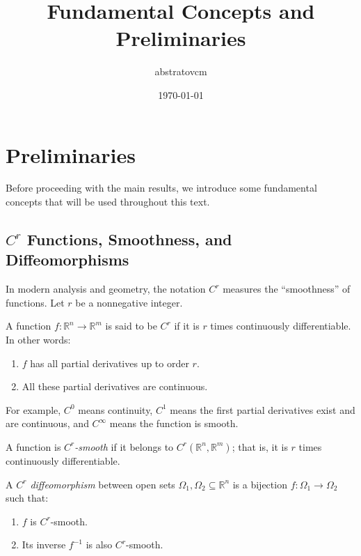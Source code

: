 \documentclass[12pt,a4paper]{article}
\begin{document}
\title{Fundamental Concepts and Preliminaries}
\author{abstratovcm}
\date{\today}
\maketitle

\tableofcontents
\newpage

\section{Preliminaries}\label{sec:preliminaries}

Before proceeding with the main results, we introduce some fundamental concepts that will be used throughout this text.

\subsection{\texorpdfstring{$C^r$}{C\^{}r} Functions, Smoothness, and Diffeomorphisms}

In modern analysis and geometry, the notation \( C^r \) measures the ``smoothness'' of functions. Let \( r \) be a nonnegative integer.

\begin{definition}[\( C^r \) Functions]\label{def:Cr_functions}
A function \( f: \mathbb{R}^n \to \mathbb{R}^m \) is said to be \emph{\( C^r \)} if it is \( r \) times continuously differentiable. In other words:
\begin{enumerate}
    \item \( f \) has all partial derivatives up to order \( r \).
    \item All these partial derivatives are continuous.
\end{enumerate}
For example, \( C^0 \) means continuity, \( C^1 \) means the first partial derivatives exist and are continuous, and \( C^\infty \) means the function is smooth.
\end{definition}

\begin{definition}[\( C^r \)-Smoothness]\label{def:Cr_smoothness}
A function is \emph{\( C^r \)-smooth} if it belongs to \( C^r(\mathbb{R}^n, \mathbb{R}^m) \); that is, it is \( r \) times continuously differentiable.
\end{definition}

\begin{definition}[\( C^r \) Diffeomorphism]\label{def:Cr_diffeomorphism}
A \emph{\( C^r \) diffeomorphism} between open sets \( \Omega_1, \Omega_2 \subseteq \mathbb{R}^n \) is a bijection \( f: \Omega_1 \to \Omega_2 \) such that:
\begin{enumerate}
    \item \( f \) is \( C^r \)-smooth.
    \item Its inverse \( f^{-1} \) is also \( C^r \)-smooth.
\end{enumerate}
\end{definition}
\end{document}
